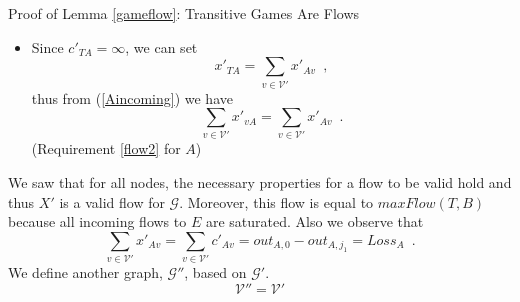 \begin{sepproof}{Proof of Lemma \ref{gameflow}: Transitive Games Are Flows}
\begin{itemize}
\begin{equation*}
      x'_{Tv} = \left(out_{v, 0} - out_{v, j_1}\right) - \left(in_{v, 0} - in_{v, j_1}\right) \enspace.
    \end{equation*}
    In this way, we have
    \begin{equation*}
      \sum\limits_{w \in \mathcal{V}'}x'_{vw} = out_{v, 0} - out_{v, j_1} \mbox{ and}
    \end{equation*}
    \begin{equation*}
    \begin{gathered}
      \sum\limits_{w \in \mathcal{V}'}x'_{wv} = \sum\limits_{w \in \mathcal{V}' \setminus \{T\}}c'_{wv} + x'_{Tv} =
      in_{v, 0} - in_{v, j_1} + \\ + (out_{v, 0} - out_{v, j_1}) - (in_{v, 0} - in_{v, j_1}) = out_{v, 0} -
      out_{v, j_1} \enspace.
    \end{gathered}
    \end{equation*}
    thus
    \begin{equation*}
      \sum\limits_{w \in \mathcal{V}'}x'_{vw} = \sum\limits_{w \in \mathcal{V}'}x'_{wv} \enspace.
    \end{equation*}
    (Requirement \ref{flow2} $\forall v \in Sad_{j_1}$)
    \item Since $c'_{TA} = \infty$, we can set
    \begin{equation*}
      x'_{TA} = \sum\limits_{v \in \mathcal{V}'}x'_{Av} \enspace,
    \end{equation*}
    thus from (\ref{Aincoming}) we have
    \begin{equation*}
      \sum\limits_{v \in \mathcal{V}'}x'_{vA} = \sum\limits_{v \in \mathcal{V}'}x'_{Av} \enspace.
    \end{equation*}
    (Requirement \ref{flow2} for $A$)
  \end{itemize}
  We saw that for all nodes, the necessary properties for a flow to be valid hold and thus $X'$ is a valid flow for
  $\mathcal{G}$. Moreover, this flow is equal to $maxFlow\left(T, B\right)$ because all incoming flows to $E$ are saturated.
  Also we observe that
  \begin{equation}
  \label{xprimeequalloss}
    \sum\limits_{v \in \mathcal{V}'}x'_{Av} = \sum\limits_{v \in \mathcal{V}'}c'_{Av} = out_{A, 0} - out_{A, j_1} =
    Loss_A \enspace.
  \end{equation}
  We define another graph, $\mathcal{G}''$, based on $\mathcal{G}'$.
  \begin{equation*}
    \mathcal{V}'' = \mathcal{V}'
  \end{equation*}

\end{sepproof}
